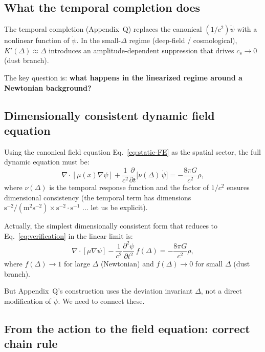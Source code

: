 \documentclass[11pt]{article}
\begin{document}
\subsection{What the temporal completion does}

The temporal completion (Appendix~Q) replaces the canonical $(1/c^2)\ddot\psi$
with a nonlinear function of $\dot\psi$. In the small-$\Delta$ regime
(deep-field / cosmological), $K'(\Delta) \approx \Delta$ introduces an
amplitude-dependent suppression that drives $c_s \to 0$ (dust branch).

The key question is: \textbf{what happens in the linearized regime around
a Newtonian background?}

\subsection{Dimensionally consistent dynamic field equation}

Using the canonical field equation Eq.~\eqref{eq:static-FE} as the
spatial sector, the full dynamic equation must be:
\begin{equation}
\nabla\cdot[\mu(x)\nabla\psi]
+ \frac{1}{c^2}\frac{\partial}{\partial t}\biggl[
  \nu(\Delta)\,\dot\psi
\biggr]
= -\frac{8\pi G}{c^2}\rho,
\label{eq:dynamic-FE}
\end{equation}
where $\nu(\Delta)$ is the temporal response function and the factor of
$1/c^2$ ensures dimensional consistency (the temporal term has dimensions
$\text{s}^{-2}/(\text{m}^2\text{s}^{-2}) \times \text{s}^{-2} \cdot \text{s}^{-1}$
... let us be explicit).

Actually, the simplest dimensionally consistent form that reduces to
Eq.~\eqref{eq:verification} in the linear limit is:
\begin{equation}
\nabla\cdot[\mu\nabla\psi]
- \frac{1}{c^2}\frac{\partial^2 \psi}{\partial t^2}\,f(\Delta)
= -\frac{8\pi G}{c^2}\rho,
\label{eq:dynamic-FE-v2}
\end{equation}
where $f(\Delta) \to 1$ for large $\Delta$ (Newtonian) and $f(\Delta)
\to 0$ for small $\Delta$ (dust branch).

But Appendix~Q's construction uses the deviation invariant $\Delta$,
not a direct modification of $\ddot\psi$. We need to connect these.

\subsection{From the action to the field equation: correct chain rule}
\end{document}
